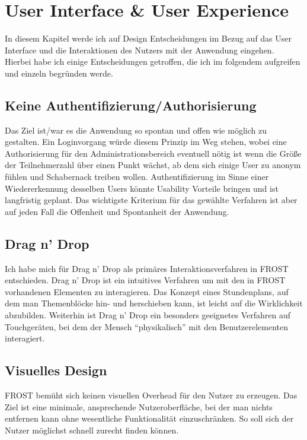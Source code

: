 \chapter{User Interface \& User Experience}
In diesem Kapitel werde ich auf Design Entscheidungen im Bezug auf das User
Interface und die Interaktionen des Nutzers mit der Anwendung eingehen.\\
Hierbei habe ich einige Entscheidungen getroffen, die ich im folgendem
aufgreifen und einzeln begründen werde.

\section{Keine Authentifizierung/Authorisierung}
Das Ziel ist/war es die Anwendung so spontan und offen wie möglich zu gestalten.
Ein Loginvorgang würde diesem Prinzip im Weg stehen, wobei eine Authorisierung
für den Administrationsbereich eventuell nötig ist wenn die Größe der
Teilnehmerzahl über einen Punkt wächst, ab dem sich einige User zu anonym fühlen
und Schabernack treiben wollen.
Authentifizierung im Sinne einer Wiedererkennung desselben Users könnte
Usability Vorteile bringen und ist langfristig geplant. Das wichtigste Kriterium
für das gewählte Verfahren ist aber auf jeden Fall die Offenheit und Spontanheit
der Anwendung.

\section{Drag n' Drop}
Ich habe mich für Drag n' Drop als primäres Interaktionsverfahren in FROST
entschieden. Drag n' Drop ist ein intuitives Verfahren um mit den in FROST
vorhandenen Elementen zu interagieren. Das Konzept eines Stundenplans, auf dem
man Themenblöcke hin- und herschieben kann, ist leicht auf die Wirklichkeit
abzubilden. Weiterhin ist Drag n' Drop ein besonders geeignetes Verfahren auf
Touchgeräten, bei dem der Mensch ``physikalisch'' mit den Benutzerelementen
interagiert.

\section{Visuelles Design}
FROST bemüht sich keinen visuellen Overhead für den Nutzer zu erzeugen. Das Ziel
ist eine minimale, ansprechende Nutzeroberfläche, bei der man nichts entfernen
kann ohne wesentliche Funktionalität einzuschränken. So soll sich der Nutzer
möglichst schnell zurecht finden können.

